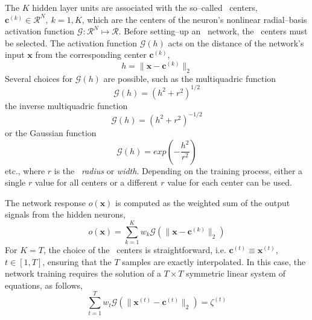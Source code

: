 \documentclass{vki_ls}
\newcommand{\vect}[1]{\bm{#1}}
\newcommand{\set}[1]{\mathcal{#1}}
\begin{document}
The $K$ hidden layer units are associated with the so--called \RBF\ centers, $\vect{c}^{(k)}\!\in\!\set{R}^N,~k=1,K$, which are the centers of the neuron's nonlinear radial--basis activation function $\set{G}:\set{R}^N \!\mapsto\!\set{R}$. 
Before setting--up an \RBF\ network, the \RBF\ centers must be selected.
The activation function $\set{G}(h)$ acts on the distance of the network's input $\vect{x}$ from the corresponding center $\vect{c}^{(k)}$,
%
\begin{equation}\label{e:rbfCen}
    h = \|\vect{x}-\vect{c}^{(k)}\|_2
\end{equation}
%
Several choices for $\set{G}(h)$ are possible, such as 
the multiquadric function
\begin{equation}\label{e:activ1}
	\set{G}(h) = \left( h^2\!+\!r^2 \right)^{1/2}
\end{equation}
%
the inverse multiquadric function
\begin{equation}\label{e:activ2}
	\set{G}(h) = \left( h^2\!+\!r^2 \right)^{-1/2}
\end{equation}
%
or the Gaussian function
\begin{equation}\label{e:activ3}
	\set{G}(h) = exp\left( -\frac{h^2}{r^2} \right)
\end{equation}
%
etc., where $r$ is the \RBF\ \emph{radius} or \emph{width}.
Depending on the training process, either a single $r$ value for all
centers or a different $r$ value for each center can be used.

The network response $o(\vect{x})$ is computed as the weighted sum of the output signals from the hidden neurons,
%
\begin{equation}\label{e:rbfn_out}
    o(\vect{x}) = \sum_{k=1}^{K} w_k \set{G}
                (\|\vect{x}-\vect{c}^{(k)}\|_2)
\end{equation}
%
For $K\!=\!T$, the choice of the \RBF\ centers is straightforward, i.e.
$\vect{c}^{(t)}\!\equiv\!\vect{x}^{(t)}$, $t\!\in\![1,T]$, ensuring
that the $T$ samples are exactly interpolated. 
In this case, the network training requires the solution of a $T\!\times\!T$ symmetric linear system of equations, as follows,
%
\begin{equation}
    \sum_{t=1}^{T} w_t \set{G}(\|\vect{x}^{(t)}-\vect{c}^{(t)}\|_2)=
    \zeta^{(t)}
    \nonumber
\end{equation}
\end{document}
